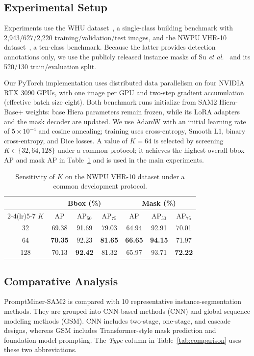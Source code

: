 \documentclass{article}
\begin{document}
\subsection{Experimental Setup}
Experiments use the WHU dataset~\cite{whu}, a single-class building benchmark
with 2,943/627/2,220 training/validation/test images, and the NWPU VHR-10
dataset~\cite{nwpu}, a ten-class benchmark. Because the latter provides
detection annotations only, we use the publicly released instance masks of
Su \textit{et al.}~\cite{nwpu_instance} and its 520/130
train/evaluation split. 

Our PyTorch implementation uses distributed data parallelism on four NVIDIA
RTX 3090 GPUs, with one image per GPU and two-step gradient accumulation
(effective batch size eight). Both benchmark runs initialize from SAM2
Hiera-Base+ weights: base Hiera parameters remain frozen, while its LoRA
adapters and the mask decoder are updated. We use AdamW with an initial
learning rate of $5\times10^{-4}$ and cosine annealing; training uses
cross-entropy, Smooth L1, binary cross-entropy, and Dice losses. A value of
$K=64$ is selected by screening $K\in\{32,64,128\}$ under a common protocol; it achieves
the highest overall bbox AP and mask AP in Table~\ref{tab:k-sensitivity} and
is used in the main experiments.

\begin{table}[H]
\caption{Sensitivity of $K$ on the NWPU VHR-10 dataset under a common development protocol.}
\label{tab:k-sensitivity}
\centering
\small
\begin{tabular}{c ccc ccc}
\toprule
& \multicolumn{3}{c}{Bbox (\%)} & \multicolumn{3}{c}{Mask (\%)} \\
\cmidrule(lr){2-4}\cmidrule(lr){5-7}
$K$ & AP & AP$_{50}$ & AP$_{75}$ & AP & AP$_{50}$ & AP$_{75}$ \\
\midrule
32  & 69.38 & 91.69 & 79.03 & 64.94 & 92.91 & 70.01 \\
64  & \textbf{70.35} & 92.23 & \textbf{81.65} & \textbf{66.65} & \textbf{94.15} & 71.97 \\
128 & 70.13 & \textbf{92.42} & 81.32 & 65.97 & 93.71 & \textbf{72.22} \\
\bottomrule
\end{tabular}
\end{table}

\subsection{Comparative Analysis}
PromptMiner-SAM2 is compared with 10 representative instance-segmentation
methods. They are grouped into CNN-based methods (CNN) and global sequence
modeling methods (GSM). CNN includes two-stage, one-stage, and cascade designs,
whereas GSM includes Transformer-style mask prediction and foundation-model
prompting. The \emph{Type} column in Table~\ref{tab:comparison} uses these two
abbreviations.
\end{document}
